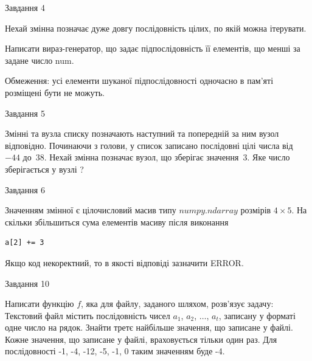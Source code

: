 \documentclass[12pt, ukrainian]{article}
\begin{document}
{\begin{minipage}[t]{8.0cm}
\end{minipage}


               
{\begin{center}Завдання {4}\end{center}}
\vspace{-4mm}
Нехай змінна  позначає дуже довгу послідовність цілих, по якій можна ітерувати.

Написати вираз-генератор, що задає підпослідовність її елементів, що менші за задане число num.

Обмеження: усі елементи шуканої підпослідовності одночасно в пам'яті розміщені бути не можуть.\par

\vspace{10mm}
               
{\begin{center}Завдання {5}\end{center}}
\vspace{-4mm}
Змінні  та  вузла списку позначають наступний та попередній за ним вузол відповідно. Починаючи з голови, у список записано послідовні цілі числа від~$-44$ до~$38$. Нехай змінна  позначає вузол, що зберігає значення~$3$.
Яке число зберігається у вузлі  ?\par

               
{\begin{center}Завдання {6}\end{center}}
\vspace{-4mm}
Значенням змінної  є цілочисловий масив типу $numpy.ndarray$ розмірів $4{\times}5$. На скільки збільшиться сума елементів масиву  після виконання
\begin{verbatim}
a[2] += 3
\end{verbatim}


Якщо код некоректний, то в якості відповіді зазначити ERROR.\par

               
{\begin{center}Завдання {10}\end{center}}
\vspace{-4mm}

Написати функцію $f$, яка для файлу, заданого шляхом, розв’язує задачу:\\ Текстовий файл містить послідовність чисел $a_1$, $a_2$, $\ldots$, $a_t$, записану у форматі одне число на рядок. Знайти третє найбільше значення, що записане у файлі. Кожне значення, що записане у файлі, враховується тільки один раз. Для послідовності -1, -4, -12, -5, -1, 0 таким значенням буде -4.

}
\end{document}

